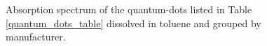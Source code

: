 \documentclass{JINST}
\begin{document}
\begin{figure}[tbh]
\begin{center}
\caption[]{Absorption spectrum of the quantum-dots listed in Table \ref{quantum_dots_table} dissolved in toluene and grouped by manufacturer.}\label{abs_spec}
\end{center}
\end{figure}
\end{document}

